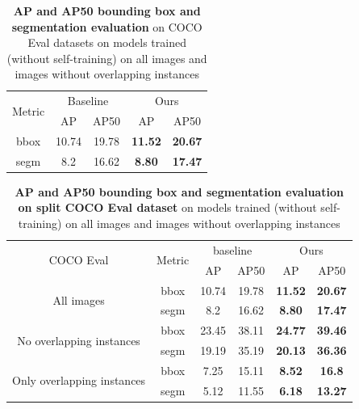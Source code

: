 \begin{table}[htbp]
	\centering
	\begin{tabular}{c|cc|cc}
		\toprule
		\multirow{2}{*}{Metric} & \multicolumn{2}{c|}{Baseline} & \multicolumn{2}{c}{Ours} \\ \cmidrule{2-5}
		& AP & AP50 & AP & AP50 \\ \midrule
		bbox & 10.74 & 19.78 & \textbf{11.52} & \textbf{20.67} \\
		\midrule
		segm & 8.2 & 16.62 & \textbf{8.80} & \textbf{17.47} \\
		\bottomrule
	\end{tabular}
	\caption[\textbf{Evaluation of Models Trained with and without Overlapping Instances }]{\textbf{AP and AP50 bounding box and segmentation evaluation} on COCO Eval datasets on models trained (without self-training) on all images and images without overlapping instances}
	\label{tab:overlap_analysis}
\end{table}

\begin{table}[htbp]
	\centering
	\begin{tabular}{c|c|cc|cc}
		\toprule
		\multirow{2}{*}{COCO Eval} & \multirow{2}{*}{Metric} & \multicolumn{2}{c|}{baseline} & \multicolumn{2}{c}{Ours} \\ \cmidrule{3-6}
		& & AP & AP50 & AP & AP50 \\ \midrule
		\multirow{2}{*}{All images} & bbox & 10.74 & 19.78 & \textbf{11.52} & \textbf{20.67} \\ 
		& segm & 8.2 & 16.62 & \textbf{8.80} & \textbf{17.47}  \\ \midrule
		\multirow{2}{*}{No overlapping instances} & bbox & 23.45 & 38.11 & \textbf{24.77} & \textbf{39.46} \\
		& segm & 19.19 & 35.19  & \textbf{20.13} & \textbf{36.36} \\
		\midrule
		\multirow{2}{*}{Only overlapping instances} & bbox & 7.25 & 15.11 & \textbf{8.52} & \textbf{16.8} \\ 
		& segm & 5.12 & 11.55 & \textbf{6.18} & \textbf{13.27} \\
		\bottomrule
	\end{tabular}
	\caption[\textbf{Evaluation of Models Trained with and without Overlapping Instances with Evaluation Dataset Split}]{\textbf{AP and AP50 bounding box and segmentation evaluation on split COCO Eval dataset} on models trained (without self-training) on all images and images without overlapping instances}
	\label{tab:combined_overlap_eval}
\end{table}

